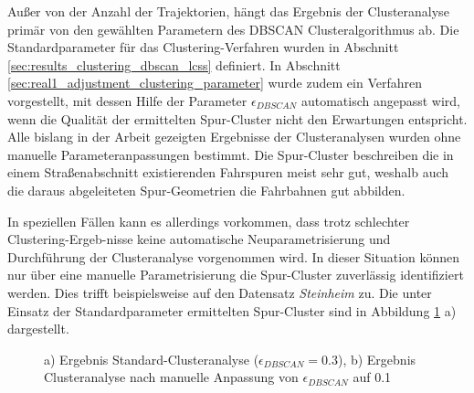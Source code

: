 Außer von der Anzahl der Trajektorien, hängt das Ergebnis der Clusteranalyse primär von den gewählten
Parametern des DBSCAN Clusteralgorithmus ab. Die Standardparameter für das Clustering-Verfahren wurden
in Abschnitt \ref{sec:results_clustering_dbscan_lcss} definiert. In Abschnitt \ref{sec:real1_adjustment_clustering_parameter}
wurde zudem ein Verfahren vorgestellt, mit dessen Hilfe der Parameter $\epsilon_{DBSCAN}$
automatisch angepasst wird, wenn die Qualität der ermittelten Spur-Cluster nicht den Erwartungen entspricht.
Alle bislang in der Arbeit gezeigten Ergebnisse der Clusteranalysen wurden ohne manuelle Parameteranpassungen bestimmt.
Die Spur-Cluster beschreiben die in einem Straßenabschnitt existierenden Fahrspuren meist sehr gut,
weshalb auch die daraus abgeleiteten Spur-Geometrien die Fahrbahnen gut abbilden.

In speziellen Fällen kann es allerdings vorkommen, dass trotz schlechter Clustering-Ergeb-nisse
keine automatische Neuparametrisierung und Durchführung der Clusteranalyse vorgenommen wird.
In dieser Situation können nur über eine manuelle Parametrisierung die Spur-Cluster zuverlässig identifiziert werden.
Dies trifft beispielsweise auf den Datensatz \textit{Steinheim} zu. Die unter Einsatz der Standardparameter
ermittelten Spur-Cluster sind in Abbildung \ref{fig:results_clusters_steinheim} a) dargestellt.

\begin{figure}[H]
    \centering
    \qquad \qquad
    \caption[Ergebnisse Clusteranalyse Steinheim]
            {a) Ergebnis Standard-Clusteranalyse ($\epsilon_{DBSCAN} = 0.3$),
            b) Ergebnis Clusteranalyse nach manuelle Anpassung von $\epsilon_{DBSCAN}$ auf 0.1}
    \label{fig:results_clusters_steinheim}
\end{figure}

